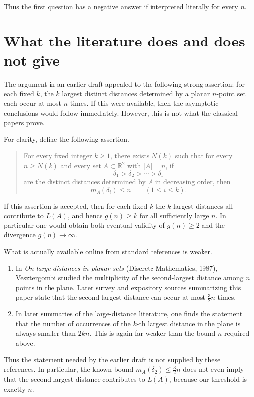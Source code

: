 \documentclass[12pt]{article}
\begin{document}
Thus the first question has a negative answer if interpreted literally for every $n$.

\section{What the literature does and does not give}

The argument in an earlier draft appealed to the following strong assertion: for each fixed $k$, the $k$ largest distinct distances determined by a planar $n$-point set each occur at most $n$ times. If this were available, then the asymptotic conclusions would follow immediately. However, this is not what the classical papers prove.

For clarity, define the following assertion.

\begin{quote}
For every fixed integer $k \ge 1$, there exists $N(k)$ such that for every $n \ge N(k)$ and every set $A \subset \mathbb{R}^2$ with $|A|=n$, if
\[
\delta_1 > \delta_2 > \cdots > \delta_s
\]
are the distinct distances determined by $A$ in decreasing order, then
\[
m_A(\delta_i) \le n \qquad (1 \le i \le k).
\]
\end{quote}

If this assertion is accepted, then for each fixed $k$ the $k$ largest distances all contribute to $L(A)$, and hence $g(n) \ge k$ for all sufficiently large $n$. In particular one would obtain both eventual validity of $g(n) \ge 2$ and the divergence $g(n) \to \infty$.

What is actually available online from standard references is weaker.

\begin{enumerate}
\item In \emph{On large distances in planar sets} (Discrete Mathematics, 1987), Vesztergombi studied the multiplicity of the second-largest distance among $n$ points in the plane.
Later survey and expository sources summarizing this paper state that the second-largest distance can occur at most $\tfrac{3}{2}n$ times.

\item In later summaries of the large-distance literature, one finds the statement that the number of occurrences of the $k$-th largest distance in the plane is always smaller than $2kn$.
This is again far weaker than the bound $n$ required above.
\end{enumerate}

Thus the statement needed by the earlier draft is not supplied by these references. In particular, the known bound $m_A(\delta_2) \le \tfrac{3}{2}n$ does not even imply that the second-largest distance contributes to $L(A)$, because our threshold is exactly $n$.
\end{document}
